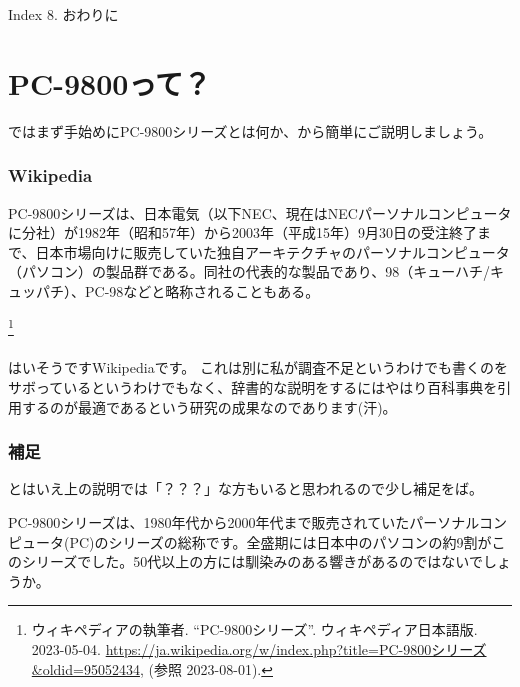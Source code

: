 \documentclass[b5paper,9pt,platex,dvipdfmx]{jsarticle}
\begin{document}
\begin{multicols*}{3}
\begin{itembox}[l]{Index}
  8. おわりに
  \end{itembox}
\part{PC-9800って？}
ではまず手始めにPC-9800シリーズとは何か、から簡単にご説明しましょう。
\section[short]{Wikipedia}
\begin{screen}
PC-9800シリーズは、日本電気（以下NEC、現在はNECパーソナルコンピュータに分社）が1982年（昭和57年）から2003年（平成15年）9月30日の受注終了まで、日本市場向けに販売していた独自アーキテクチャのパーソナルコンピュータ（パソコン）の製品群である。同社の代表的な製品であり、98（キューハチ/キュッパチ）、PC-98などと略称されることもある。
\end{screen}
\footnote{ウィキペディアの執筆者. “PC-9800シリーズ”. ウィキペディア日本語版. 2023-05-04. \url{https://ja.wikipedia.org/w/index.php?title=PC-9800シリーズ&oldid=95052434}, (参照 2023-08-01).}
\\
\\
はいそうですWikipediaです。
これは別に私が調査不足というわけでも書くのをサボっているというわけでもなく、辞書的な説明をするにはやはり百科事典を引用するのが最適であるという研究の成果なのであります(汗)。
\section[short]{補足}
とはいえ上の説明では「？？？」な方もいると思われるので少し補足をば。

PC-9800シリーズは、1980年代から2000年代まで販売されていたパーソナルコンピュータ(PC)のシリーズの総称です。全盛期には日本中のパソコンの約9割がこのシリーズでした。50代以上の方には馴染みのある響きがあるのではないでしょうか。


\end{multicols*}
\end{document}
